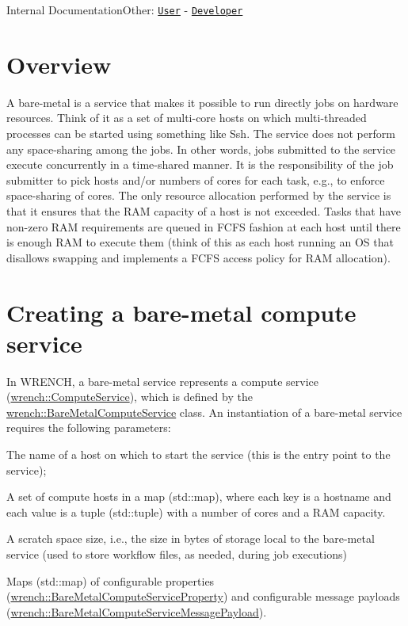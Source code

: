 Internal DocumentationOther\+: \href{../user/guide-baremetal.html}{\tt User} -\/ \href{../developer/guide-baremetal.html}{\tt Developer}\hypertarget{guide-baremetal_guide-baremetal-overview}{}\section{Overview}\label{guide-baremetal_guide-baremetal-overview}
A bare-\/metal is a service that makes it possible to run directly jobs on hardware resources. Think of it as a set of multi-\/core hosts on which multi-\/threaded processes can be started using something like Ssh. The service does not perform any space-\/sharing among the jobs. In other words, jobs submitted to the service execute concurrently in a time-\/shared manner. It is the responsibility of the job submitter to pick hosts and/or numbers of cores for each task, e.\+g., to enforce space-\/sharing of cores. The only resource allocation performed by the service is that it ensures that the R\+AM capacity of a host is not exceeded. Tasks that have non-\/zero R\+AM requirements are queued in F\+C\+FS fashion at each host until there is enough R\+AM to execute them (think of this as each host running an OS that disallows swapping and implements a F\+C\+FS access policy for R\+AM allocation).\hypertarget{guide-baremetal_guide-baremetal-creating}{}\section{Creating a bare-\/metal compute service}\label{guide-baremetal_guide-baremetal-creating}
In W\+R\+E\+N\+CH, a bare-\/metal service represents a compute service ({\ttfamily \hyperlink{classwrench_1_1_compute_service}{wrench\+::\+Compute\+Service}}), which is defined by the {\ttfamily \hyperlink{classwrench_1_1_bare_metal_compute_service}{wrench\+::\+Bare\+Metal\+Compute\+Service}} class. An instantiation of a bare-\/metal service requires the following parameters\+:


\begin{DoxyItemize}
\item The name of a host on which to start the service (this is the entry point to the service);
\item A set of compute hosts in a map ({\ttfamily std\+::map}), where each key is a hostname and each value is a tuple ({\ttfamily std\+::tuple}) with a number of cores and a R\+AM capacity.
\item A scratch space size, i.\+e., the size in bytes of storage local to the bare-\/metal service (used to store workflow files, as needed, during job executions)
\item Maps ({\ttfamily std\+::map}) of configurable properties ({\ttfamily \hyperlink{classwrench_1_1_bare_metal_compute_service_property}{wrench\+::\+Bare\+Metal\+Compute\+Service\+Property}}) and configurable message payloads ({\ttfamily \hyperlink{classwrench_1_1_bare_metal_compute_service_message_payload}{wrench\+::\+Bare\+Metal\+Compute\+Service\+Message\+Payload}}).
\end{DoxyItemize}

